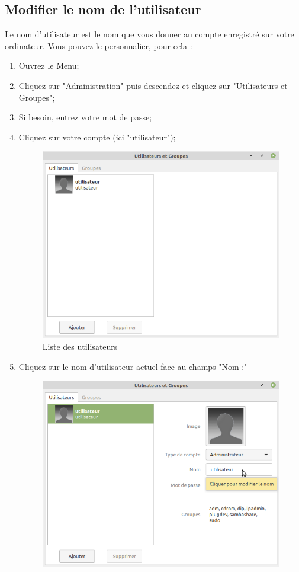 \documentclass[12pt]{book}
\begin{document}
	\subsection{Modifier le nom de l'utilisateur}
		Le nom d'utilisateur est le nom que vous donner au compte enregistré sur votre ordinateur.
		Vous pouvez le personnalier, pour cela :
		\begin{enumerate}
			\item Ouvrez le Menu;
			\item Cliquez sur "Administration" puis descendez et cliquez sur "Utilisateurs et Groupes";
			\item Si besoin, entrez votre mot de passe;
			\item Cliquez sur votre compte (ici "utilisateur");
			\begin{figure}[h]
				\centering
				\includegraphics[width=\textwidth]{include/users.png}
				\caption{Liste des utilisateurs}
				\label{fig:nomuser}
			\end{figure}
			\item Cliquez sur le nom d'utilisateur actuel face au champs "Nom :"
			\begin{figure}[h]
				\centering
				\includegraphics[width=\textwidth]{include/nomuser.png}

\end{figure}
\end{enumerate}
\end{document}
